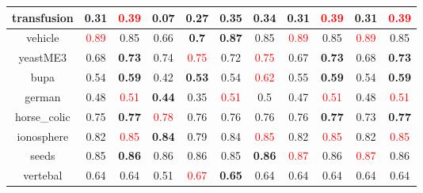 \documentclass{article}%
\begin{document}
\begin{tabular}{c|cccccccccc}
\hline%
transfusion&0.31&\textcolor{red}{ 
0.39
}&0.07&\textbf{0.27}&\textbf{0.35}&0.34&0.31&\textcolor{red}{ 
0.39
}&0.31&\textcolor{red}{ 
0.39
}\\%
\hline%
vehicle&\textcolor{red}{ 
0.89
}&0.85&0.66&\textbf{0.7}&\textbf{0.87}&0.85&\textcolor{red}{ 
0.89
}&0.85&\textcolor{red}{ 
0.89
}&0.85\\%
\hline%
yeastME3&0.68&\textbf{0.73}&0.74&\textcolor{red}{ 
0.75
}&0.72&\textcolor{red}{ 
0.75
}&0.67&\textbf{0.73}&0.68&\textbf{0.73}\\%
\hline%
bupa&0.54&\textbf{0.59}&0.42&\textbf{0.53}&0.54&\textcolor{red}{ 
0.62
}&0.55&\textbf{0.59}&0.54&\textbf{0.59}\\%
\hline%
german&0.48&\textcolor{red}{ 
0.51
}&\textbf{0.44}&0.35&\textcolor{red}{ 
0.51
}&0.5&0.47&\textcolor{red}{ 
0.51
}&0.48&\textcolor{red}{ 
0.51
}\\%
\hline%
horse\_colic&0.75&\textbf{0.77}&\textcolor{red}{ 
0.78
}&0.76&0.76&0.76&0.76&\textbf{0.77}&0.73&\textbf{0.77}\\%
\hline%
ionosphere&0.82&\textcolor{red}{ 
0.85
}&\textbf{0.84}&0.79&0.84&\textcolor{red}{ 
0.85
}&0.82&\textcolor{red}{ 
0.85
}&0.82&\textcolor{red}{ 
0.85
}\\%
\hline%
seeds&0.85&\textbf{0.86}&0.86&0.86&0.85&\textbf{0.86}&\textcolor{red}{ 
0.87
}&0.86&\textcolor{red}{ 
0.87
}&0.86\\%
\hline%
vertebal&0.64&0.64&0.51&\textcolor{red}{ 
0.67
}&\textbf{0.65}&0.64&0.64&0.64&0.64&0.64\\%
\hline%
\end{tabular}

%
\end{document}

